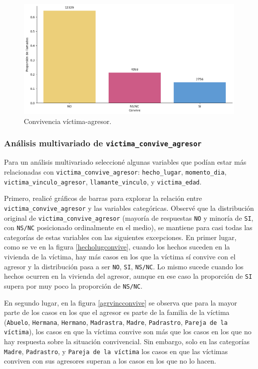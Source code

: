 \documentclass[10 pt]{article}
\begin{document}
\begin{figure}[H]
    \begin{center}
    \includegraphics[scale=.4]{images/latex_convive.png}
    \caption{Convivencia víctima-agresor.}
    \label{convivencia}
    \end{center}
    \end{figure}


\subsubsection{Análisis multivariado de \texttt{victima\_convive\_agresor}}\label{faltantes}


Para un análisis multivariado seleccioné algunas variables que podían estar más relacionadas con 
\texttt{victima\_convive\_agresor}: \texttt{hecho\_lugar}, \texttt{momento\_dia}, \texttt{victima\_vinculo\_agresor}, \texttt{llamante\_vinculo}, y \texttt{victima\_edad}. 

Primero, realicé gráficos de barras para explorar la relación entre \texttt{victima\_convive\_agresor} y las variables categóricas.
Observé que la distribución original de \texttt{victima\_convive\_agresor} (mayoría de respuestas \texttt{NO} y minoría de \texttt{SI}, con \texttt{NS/NC} posicionado ordinalmente en el medio), se mantiene para casi todas las categorías de estas variables con las siguientes excepciones. En primer lugar, como se ve en la figura \ref{hecholugconvive}, cuando los hechos suceden en la vivienda de la víctima, hay más casos en los que la víctima sí convive con el agresor y la distribución pasa a ser \texttt{NO}, \texttt{SI}, \texttt{NS/NC}. Lo mismo sucede cuando los hechos ocurren en la vivienda del agresor, aunque en ese caso la proporción de \texttt{SI} supera por muy poco la proporción de \texttt{NS/NC}. 

En segundo lugar, en la figura \ref{agrvincconvive} se observa que para la mayor parte de los casos en los que el agresor es parte de la familia de la víctima (\texttt{Abuelo}, \texttt{Hermana}, \texttt{Hermano}, \texttt{Madrastra}, \texttt{Madre}, \texttt{Padrastro}, \texttt{Pareja de la víctima}), los casos en que la víctima convive son más que los casos en los que no hay respuesta sobre la situación convivencial. Sin embargo, solo en las categorías \texttt{Madre}, \texttt{Padrastro}, y \texttt{Pareja de la víctima} los casos en que las víctimas conviven con sus agresores superan a los casos en los que no lo hacen.
\end{document}
